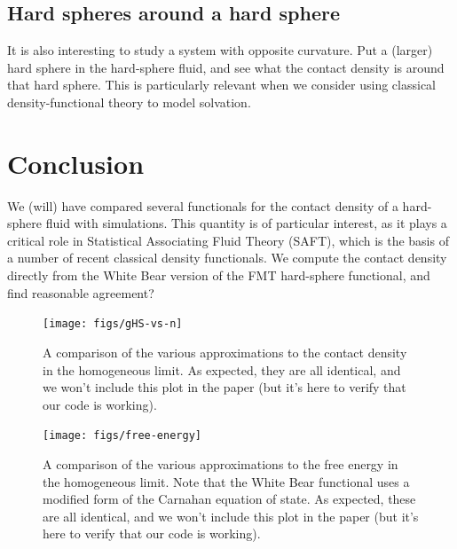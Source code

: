 \documentclass[letterpaper,twocolumn,amsmath,amssymb,jcp,10pt,aip]{revtex4-1}
\begin{document}
\subsection{Hard spheres around a hard sphere}

It is also interesting to study a system with opposite curvature.  Put
a (larger) hard sphere in the hard-sphere fluid, and see what the
contact density is around that hard sphere.  This is particularly
relevant when we consider using classical density-functional theory to
model solvation.


\section{Conclusion}
We (will) have compared several functionals for the contact density of
a hard-sphere fluid with simulations.  This quantity is of particular
interest, as it plays a critical role in Statistical Associating Fluid
Theory (SAFT), which is the basis of a number of recent classical
density functionals.  We compute the contact density directly from the
White Bear version of the FMT hard-sphere functional, and find
reasonable agreement?

\appendix

\begin{figure}
\texttt{[image: figs/gHS-vs-n]}
\caption{A comparison of the various approximations to the contact
  density in the homogeneous limit.  As expected, they are all
  identical, and we won't include this plot in the paper (but it's
  here to verify that our code is working).}
\label{fig:gHS-vs-n}
\end{figure}

\begin{figure}
\texttt{[image: figs/free-energy]}
\caption{A comparison of the various approximations to the free energy
  in the homogeneous limit.  Note that the White Bear functional uses
  a modified form of the Carnahan equation of state.  As expected,
  these are all identical, and we won't include this plot in the paper
  (but it's here to verify that our code is working).}
\label{fig:free-energy}
\end{figure}
\end{document}
